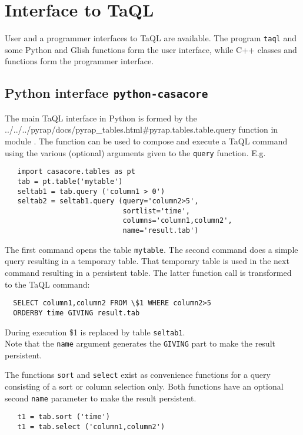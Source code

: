 \section{\label{TAQL:GLISHPC}Interface to TaQL}
User and a programmer interfaces to TaQL are available.
The program \texttt{taql} and some Python and Glish functions form the
user interface, while C++ classes and functions
form the programmer interface.

\subsection{Python interface \texttt{python-casacore}}
  The main TaQL interface in Python is formed by the
  {../../../pyrap/docs/pyrap_tables.html\#pyrap.tables.table.query} function in module
  .
  The function can be used
  to compose and execute a TaQL command using the various (optional)
  arguments given to the \texttt{query} function. E.g.
\begin{verbatim}
   import casacore.tables as pt
   tab = pt.table('mytable')
   seltab1 = tab.query ('column1 > 0')
   seltab2 = seltab1.query (query='column2>5',
                            sortlist='time',
                            columns='column1,column2',
                            name='result.tab')
\end{verbatim}
  The first command opens the table \texttt{mytable}.
  The second command does a simple query resulting in a temporary
  table. That temporary table is used in the next command resulting in
  a persistent table. The latter function call is transformed to
  the TaQL command:
\begin{verbatim}
  SELECT column1,column2 FROM \$1 WHERE column2>5
  ORDERBY time GIVING result.tab
\end{verbatim}
  During execution \$1 is replaced by table \texttt{seltab1}.
  \\Note that the \texttt{name} argument
  generates the \texttt{GIVING} part to make the result persistent.

  The functions \texttt{sort} and \texttt{select} exist as convenience
  functions for a query consisting of a sort or  column selection
  only. Both functions have an optional second \texttt{name} parameter
  to make the result persistent.
\begin{verbatim}
   t1 = tab.sort ('time')
   t1 = tab.select ('column1,column2')
\end{verbatim}

